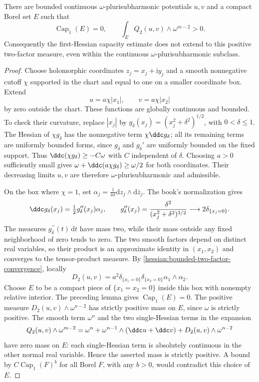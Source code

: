 \begin{example}\label{hessian:sobolev-two-product-obstruction}
There are bounded continuous $\omega$-plurisubharmonic potentials
$u,v$ and a compact Borel set $E$ such that
\[
 \operatorname{Cap}_1(E)=0,\qquad
 \int_E Q_2(u,v)\wedge\omega^{m-2}>0.
\]
Consequently the first-Hessian capacity estimate does not extend to
this positive two-factor measure, even within the continuous
$\omega$-plurisubharmonic subclass.
\end{example}
\begin{proof}
Choose holomorphic coordinates $z_j=x_j+\mathrm i y_j$ and a smooth
nonnegative cutoff $\chi$ supported in the chart and equal to one
on a smaller coordinate box. Extend
\[
 u=a\chi|x_1|,\qquad v=a\chi|x_2|
\]
by zero outside the chart. These functions are globally continuous
and bounded. To check their curvature, replace $|x_j|$ by
$g_\delta(x_j)=(x_j^2+\delta^2)^{1/2}$, with $0<\delta\leq1$.
The Hessian of $\chi g_\delta$ has the nonnegative term
$\chi\ddc g_\delta$; all its remaining terms are uniformly bounded
forms, since $g_\delta$ and $g_\delta'$ are uniformly bounded on the
fixed support. Thus $\ddc(\chi g_\delta)\geq-C\omega$ with $C$
independent of $\delta$. Choosing $a>0$ sufficiently small gives
$\omega+\ddc(a\chi g_\delta)\geq\omega/2$ for both coordinates.
Their decreasing limits $u,v$ are therefore
$\omega$-plurisubharmonic and admissible.

On the box where $\chi=1$, set
$\alpha_j=\frac{\mathrm i}{4\pi}\mathrm dz_j\wedge\mathrm d\bar z_j$.
The book's normalization gives
\[
 \ddc g_\delta(x_j)=\tfrac12g_\delta''(x_j)\alpha_j,
 \qquad g_\delta''(x_j)
       =\frac{\delta^2}{(x_j^2+\delta^2)^{3/2}}
       \longrightarrow2\delta_{\{x_j=0\}}.
\]
The measures $g_\delta^{\prime\prime}(t)\,\mathrm dt$ have mass two,
while their mass outside any fixed neighborhood of zero tends to
zero. The two
smooth factors depend on distinct real variables, so their product
is an approximate identity in $(x_1,x_2)$ and converges to the
tensor-product measure. By
\cref{hessian:bounded-two-factor-convergence}, locally
\[
 D_2(u,v)=a^2\delta_{\{x_1=0\}}\delta_{\{x_2=0\}}
                         \alpha_1\wedge\alpha_2.
\]
Choose $E$ to be a compact piece of $\{x_1=x_2=0\}$ inside this
box with nonempty relative interior. The preceding lemma gives
$\operatorname{Cap}_1(E)=0$. The positive measure
$D_2(u,v)\wedge\omega^{n-2}$ has strictly positive mass on $E$,
since $\omega$ is strictly positive. The smooth term $\omega^n$ and
the two single-Hessian terms in the expansion
\[
 Q_2(u,v)\wedge\omega^{m-2}
 =\omega^n+\omega^{n-1}\wedge(\ddc u+\ddc v)
                         +D_2(u,v)\wedge\omega^{n-2}
\]
have zero mass on $E$: each single-Hessian term is absolutely
continuous in the other normal real variable. Hence the asserted
mass is strictly positive. A bound by
$C\operatorname{Cap}_1(F)^b$ for all Borel $F$, with any $b>0$,
would contradict this choice of $E$.
\end{proof}
